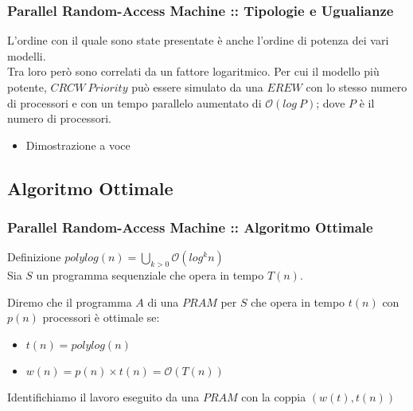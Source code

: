 \documentclass{beamer}
\newcommand{\bigO}{\ensuremath{\mathcal{O}}} %
\begin{document}
\begin{frame}
	\frametitle{Parallel Random-Access Machine :: Tipologie e Ugualianze} %
	L'ordine con il quale sono state presentate è anche l'ordine di potenza dei vari modelli.\\
	Tra loro però sono correlati da un fattore logaritmico. Per cui il modello più potente, $CRCW\ Priority$ può essere simulato da una $EREW$ con lo stesso numero di processori e con un tempo parallelo aumentato di $\bigO{(log\ P)}$; dove $P$ è il numero di processori.
	\begin{itemize}
		\item Dimostrazione a voce
	\end{itemize}
\end{frame}

\subsection{Algoritmo Ottimale}

\begin{frame}
	\frametitle{Parallel Random-Access Machine :: Algoritmo Ottimale} %
	
	\begin{block}{Definizione}
		$polylog(n) = \bigcup_{k>0}\bigO{(log^k n)}$\\
		Sia $S$ un programma sequenziale che opera in tempo $T(n)$.\\
	\end{block}
	Diremo che il programma $A$ di una $PRAM$ per $S$ che opera in tempo $t(n)$ con $p(n)$ processori è ottimale se:
	\begin{itemize}
		\item $t(n) = polylog(n)$
		\item $w(n) = p(n)\times t(n) = \bigO{(T(n))}$
	\end{itemize}
	Identifichiamo il lavoro eseguito da una $PRAM$ con la coppia $(w(t),t(n))$
\end{frame}
\end{document}
